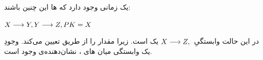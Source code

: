 \documentclass{article}
\begin{document}
\section{}
\subsection{}

\subsection{}
یک  زمانی وجود دارد که ها این چنین باشند:
\begin{latin}
$
\\
X\longrightarrow Y,\\
Y\longrightarrow Z,\\
PK=X\\
\\
$
\end{latin}
در این حالت وابستگیِ
$
X\longrightarrow Z,\\
$
یک  است. زیرا  مقدار  را از طریق 
 تعیین می‌کند. وجودِ یک وابستگی میان های ، نشان‌دهنده‌ی وجود  است.
\end{document}
